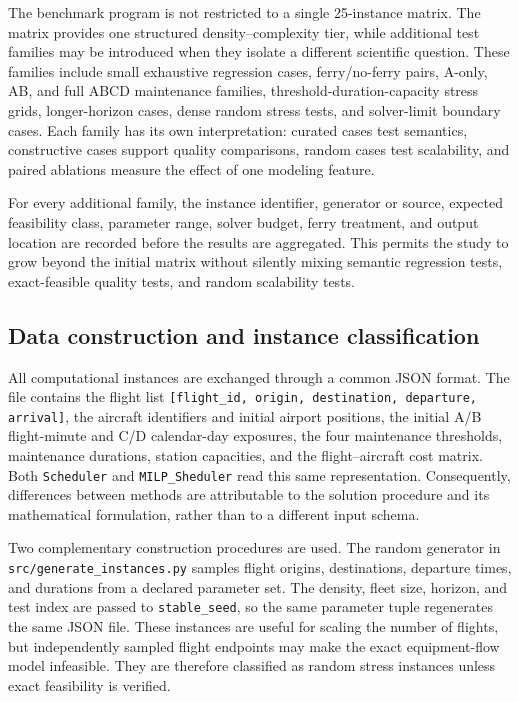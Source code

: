 The benchmark program is not restricted to a single 25-instance matrix. The
matrix provides one structured density--complexity tier, while additional test
families may be introduced when they isolate a different scientific question.
These families include small exhaustive regression cases, ferry/no-ferry pairs,
A-only, AB, and full ABCD maintenance families, threshold-duration-capacity
stress grids, longer-horizon cases, dense random stress tests, and solver-limit
boundary cases. Each family has its own interpretation: curated cases test
semantics, constructive cases support quality comparisons, random cases test
scalability, and paired ablations measure the effect of one modeling feature.

For every additional family, the instance identifier, generator or source,
expected feasibility class, parameter range, solver budget, ferry treatment, and
output location are recorded before the results are aggregated. This permits
the study to grow beyond the initial matrix without silently mixing semantic
regression tests, exact-feasible quality tests, and random scalability tests.

\subsection{Data construction and instance classification}
\label{subsec:computational_data_classification}

All computational instances are exchanged through a common JSON format. The
file contains the flight list
\texttt{[flight\_id, origin, destination, departure, arrival]}, the aircraft
identifiers and initial airport positions, the initial A/B flight-minute and
C/D calendar-day exposures, the four maintenance thresholds, maintenance
durations, station capacities, and the flight--aircraft cost matrix. Both
\texttt{Scheduler} and \texttt{MILP\_Sheduler} read this same representation.
Consequently, differences between methods are attributable to the solution
procedure and its mathematical formulation, rather than to a different input
schema.

Two complementary construction procedures are used. The random generator in
\texttt{src/generate\_instances.py} samples flight origins, destinations,
departure times, and durations from a declared parameter set. The density,
fleet size, horizon, and test index are passed to \texttt{stable\_seed}, so the
same parameter tuple regenerates the same JSON file. These instances are useful
for scaling the number of flights, but independently sampled flight endpoints
may make the exact equipment-flow model infeasible. They are therefore
classified as random stress instances unless exact feasibility is verified.

